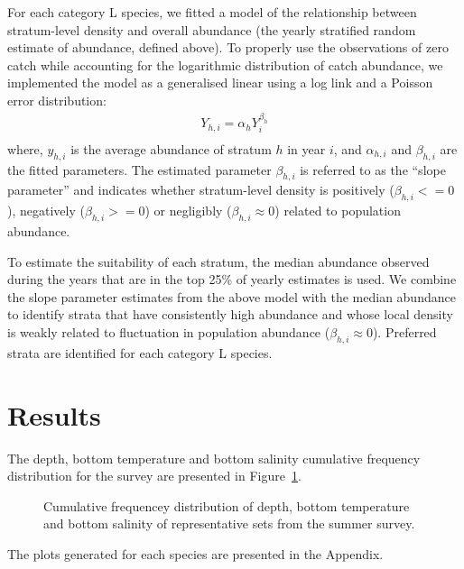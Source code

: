 \documentclass[12pt]{article}\usepackage[]{graphicx}\usepackage[]{color}
\begin{document}
For each category L species, we fitted a model of the relationship between stratum-level density and overall abundance (the yearly stratified random estimate of abundance, defined above). To properly use the observations of zero catch while accounting for the logarithmic distribution of catch abundance, we implemented the model as a generalised linear using a log link and a Poisson error distribution:
\begin{eqnarray*}\label{eqHabitat Selection}
Y_{h,i} = \alpha_{h} Y_{i}^{\beta_h}
\\
\end{eqnarray*}
where, \(y_{h,i}\) is the average abundance of stratum \(h\) in year \(i\), and \(\alpha_{h,i}\) and \(\beta_{h,i}\) are the fitted parameters. The estimated parameter \(\beta_{h,i}\) is referred to as the ``slope parameter'' and indicates whether stratum-level density is positively (\(\beta_{h,i} <= 0\)), negatively (\(\beta_{h,i} >= 0\)) or negligibly (\(\beta_{h,i} \approx 0\)) related to population abundance.

To estimate the suitability of each stratum, the median abundance observed during the years that are in the top 25\% of yearly estimates is used. We combine the slope parameter estimates from the above model with the median abundance to identify strata that have consistently high abundance and whose local density is weakly related to fluctuation in population abundance (\(\beta_{h,i} \approx 0\)). Preferred strata are identified for each category L species.

\hypertarget{results}{%
\section{Results}\label{results}}

The depth, bottom temperature and bottom salinity cumulative frequency distribution for the survey are presented in Figure~\ref{fig:setsdist}.


\begin{figure}[htb]

{\centering {} 

}

\caption{Cumulative frequencey distribution of depth, bottom temperature and bottom salinity of representative sets from the summer survey.}\label{fig:setsdist}
\end{figure}
The plots generated for each species are presented in the Appendix.
\end{document}
